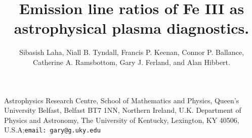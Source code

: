 \documentclass{emulateapj}
\begin{document}
\title{Emission line ratios of Fe III as astrophysical plasma diagnostics.}


\author{Sibasish Laha, Niall B. Tyndall, Francis P. Keenan, Connor P. Ballance, \\ Catherine A. Ramsbottom, Gary J. Ferland, and Alan Hibbert.} {Astrophysics Research Centre, School of Mathematics and Physics, Queen's University Belfast, Belfast BT7 1NN, Northern Ireland, U.K.} {Department of Physics and Astronomy, The University of Kentucky, Lexington, KY 40506, U.S.A;{\tt email: gary@g.uky.edu}}













\end{document}
